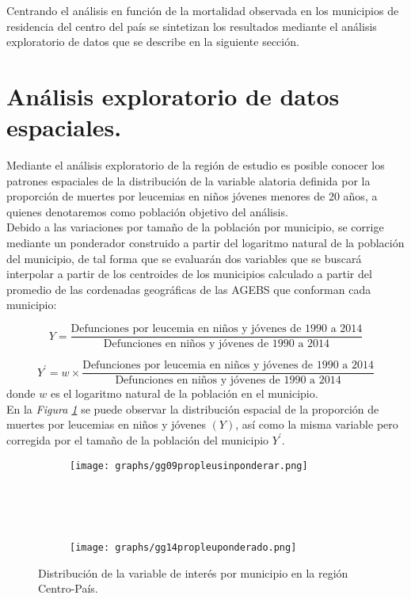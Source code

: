 \documentclass[11pt, oneside]{book}
\begin{document}
Centrando el análisis en función de la mortalidad observada en los municipios de residencia del centro del país se sintetizan los resultados mediante el análisis exploratorio de datos que se describe en la siguiente sección.\\


\section{Análisis exploratorio de datos espaciales.}
Mediante el análisis exploratorio de la región de estudio es posible conocer los patrones espaciales de la distribución de la variable alatoria definida por la proporción de muertes por leucemias en niños jóvenes menores de 20 años, a quienes denotaremos como población objetivo del análisis.\\

Debido a las variaciones por tamaño de la población por municipio, se corrige mediante un ponderador construido a partir del logaritmo natural de la población del municipio, de tal forma que se evaluarán dos variables que se buscará interpolar a partir de los centroides de los municipios calculado a partir del promedio de las cordenadas geográficas de las AGEBS que conforman cada municipio:

\[Y = \frac{\textrm{Defunciones por leucemia en niños y jóvenes de 1990 a 2014}}{\textrm{Defunciones en niños y jóvenes de 1990 a 2014}}\]

\[Y^{'} = w \times \frac{\textrm{Defunciones por leucemia en niños y jóvenes de 1990 a 2014}}{\textrm{Defunciones en niños y jóvenes de 1990 a 2014}}\]
donde $w$ es el logaritmo natural de la población en el municipio.\\


En la \emph{Figura \ref{fig09y14.y}} se puede observar la distribución espacial de la proporción de muertes por leucemias en niños y jóvenes $(Y)$, así como la misma variable pero corregida por el tamaño de la población del municipio $Y^{'}$.\\

\begin{figure}[!ht]
	\begin{subfigure}{0.9\textwidth}
	  \centering
	  \texttt{[image: graphs/gg09propleusinponderar.png]}
	\end{subfigure}%
	\\\\\\
	\begin{subfigure}{0.9\textwidth}
	  \centering
    \texttt{[image: graphs/gg14propleuponderado.png]}
	\end{subfigure}
  \caption{Distribución de la variable de interés por municipio en la región Centro-País.}
  \label{fig09y14.y}
\end{figure}
\end{document}
